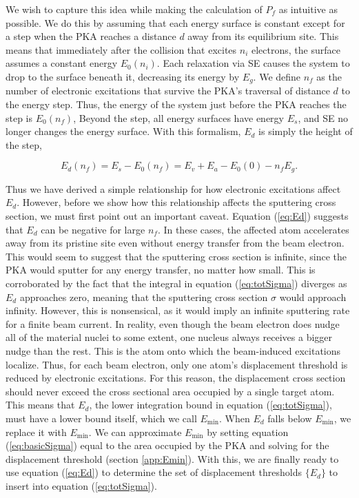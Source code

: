 \documentclass{article}
\begin{document}
We wish to capture this idea while making the calculation of $P_f$ as
intuitive as possible.
We do this by assuming that each energy surface is constant except for a step
when the PKA reaches a distance $d$ away from its equilibrium site.
This means that immediately after the collision that excites $n_i$ electrons,
the surface assumes a constant energy $E_0(n_i)$.
Each relaxation via SE causes the system to drop to the surface beneath it,
decreasing its energy by $E_g$.
We define $n_f$ as the number of electronic excitations that survive the PKA's
traversal of distance $d$ to the energy step.
Thus, the energy of the system just before the PKA reaches the step is
$E_0(n_f)$,
Beyond the step, all energy surfaces have energy $E_s$, and SE no longer
changes the energy surface. 
With this formalism, $E_d$ is simply the height of the step,

\begin{equation}
  E_d(n_f) = E_s - E_0(n_f) = E_v + E_a - E_0(0) - n_f E_g.
  \label{eq:Ed}
\end{equation}

Thus we have derived a simple relationship for how electronic excitations
affect $E_d$.
However, before we show how this relationship affects the sputtering
cross section, we must first point out an important caveat.
Equation (\ref{eq:Ed}) suggests that $E_d$ can be negative for large $n_f$.
In these cases, the affected atom accelerates away from its pristine site even
without energy transfer from the beam electron.
This would seem to suggest that the sputtering cross section is infinite, since
the PKA would sputter for any energy transfer, no matter how small.
This is corroborated by the fact that the integral in equation
(\ref{eq:totSigma}) diverges as $E_d$ approaches zero, meaning that the
sputtering cross section $\sigma$ would approach infinity.
However, this is nonsensical, as it would imply an infinite sputtering rate for
a finite beam current.
In reality, even though the beam electron does nudge all of the material nuclei
to some extent, one nucleus always receives a bigger nudge than the rest.
This is the atom onto which the beam-induced excitations localize.
Thus, for each beam electron, only one atom's displacement threshold is reduced
by electronic excitations.
For this reason, the displacement cross section should never exceed the
cross sectional area occupied by a single target atom.
This means that $E_d$, the lower integration bound in equation
(\ref{eq:totSigma}), must have a lower bound itself, which we call
$E_\text{min}$.
When $E_d$ falls below $E_\text{min}$, we replace it with $E_\text{min}$.
We can approximate $E_\text{min}$ by setting equation (\ref{eq:basicSigma})
equal to the area occupied by the PKA and solving for the displacement
threshold (section \ref{app:Emin}).
With this, we are finally ready to use equation (\ref{eq:Ed}) to determine the
set of displacement thresholds $\{E_d\}$ to insert into equation
(\ref{eq:totSigma}).
\end{document}
